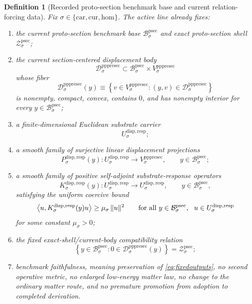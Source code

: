 \documentclass[11pt]{article}
\newcommand{\Car}{\mathrm{car}}
\newcommand{\Cur}{\mathrm{cur}}
\newcommand{\Hom}{\mathrm{hom}}
\newcommand{\ProtoSectionBody}[1]{\mathcal B_{#1}^{\mathrm{psec}}}
\newcommand{\ProtoSectionShell}[1]{\mathcal Z_{#1}^{\mathrm{psec}}}
\newcommand{\PrePreProtoSectionVertical}[1]{V_{#1}^{\mathrm{pppresec}}}
\newcommand{\PrePreProtoSectionResidualBody}[1]{\mathcal D_{#1}^{\mathrm{pppresec}}}
\newcommand{\SubstrateCarrier}[1]{U_{#1}^{\mathrm{disp,resp}}}
\newcommand{\SubstrateProjection}[1]{P_{#1}^{\mathrm{disp,resp}}}
\newcommand{\SubstrateOperator}[1]{K_{#1}^{\mathrm{disp,resp}}}
\newtheorem{definition}{Definition}
\begin{document}
\begin{definition}[Recorded proto-section benchmark base and current relation-forcing data]
\label{def:route}
Fix \(\sigma\in\{\Car,\Cur,\Hom\}\). The active line already fixes:
\begin{enumerate}
    \item the current proto-section benchmark base \(\ProtoSectionBody{\sigma}\) and exact proto-section shell \(\ProtoSectionShell{\sigma}\);
    \item the current section-centered displacement body
    \[
    \PrePreProtoSectionResidualBody{\sigma}
    \subset
    \ProtoSectionBody{\sigma}\times\PrePreProtoSectionVertical{\sigma}
    \]
    whose fiber
    \[
    \PrePreProtoSectionResidualBody{\sigma}(y)
    \equiv
    \left\{
    v\in\PrePreProtoSectionVertical{\sigma}:(y,v)\in\PrePreProtoSectionResidualBody{\sigma}
    \right\}
    \]
    is nonempty, compact, convex, contains \(0\), and has nonempty interior for every \(y\in\ProtoSectionBody{\sigma}\);
    \item a finite-dimensional Euclidean substrate carrier
    \[
    \SubstrateCarrier{\sigma};
    \]
    \item a smooth family of surjective linear displacement projections
    \[
    \SubstrateProjection{\sigma}(y):
    \SubstrateCarrier{\sigma}\to\PrePreProtoSectionVertical{\sigma},
    \qquad
    y\in\ProtoSectionBody{\sigma};
    \]
    \item a smooth family of positive self-adjoint substrate-response operators
    \[
    \SubstrateOperator{\sigma}(y):
    \SubstrateCarrier{\sigma}\to\SubstrateCarrier{\sigma},
    \qquad
    y\in\ProtoSectionBody{\sigma},
    \]
    satisfying the uniform coercive bound
    \begin{equation}
    \ev{u,\SubstrateOperator{\sigma}(y)u}
    \ge
    \mu_{\sigma}\,\|u\|^2
    \qquad
    \text{for all }
    y\in\ProtoSectionBody{\sigma},
    \ \ u\in\SubstrateCarrier{\sigma}
    \label{eq:coercive}
    \end{equation}
    for some constant \(\mu_{\sigma}>0\);
    \item the fixed exact-shell/current-body compatibility relation
    \[
    \left\{
    y\in\ProtoSectionBody{\sigma}:0\in\PrePreProtoSectionResidualBody{\sigma}(y)
    \right\}
    =
    \ProtoSectionShell{\sigma};
    \]
    \item benchmark faithfulness, meaning preservation of \eqref{eq:fixedoutputs}, no second operative metric, no enlarged low-energy matter law, no change to the ordinary matter route, and no premature promotion from adoption to completed derivation.
\end{enumerate}
\end{definition}
\end{document}
